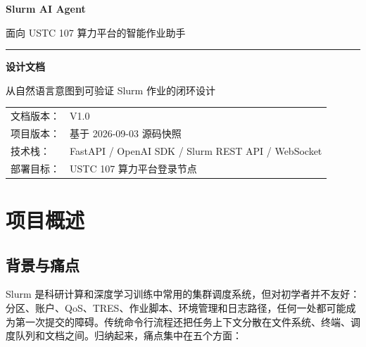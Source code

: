 \documentclass[UTF8,11pt,a4paper]{ctexart}
\begin{document}
\begin{titlepage}
  \pagecolor{navy}
  \color{white}
  \vspace*{22mm}
  {\Huge\bfseries Slurm AI Agent\par}
  \vspace{5mm}
  {\LARGE 面向 USTC 107 算力平台的智能作业助手\par}
  \vspace{12mm}
  {\color{cyan}\rule{0.76\textwidth}{1.5pt}\par}
  \vspace{12mm}
  {\fontsize{30}{36}\selectfont\bfseries 设计文档\par}
  \vspace{10mm}
  {\Large 从自然语言意图到可验证 Slurm 作业的闭环设计\par}
  \vfill
  \begin{tabular}{@{}ll@{}}
    文档版本：& V1.0\\[2mm]
    项目版本：& 基于 2026-09-03 源码快照\\[2mm]
    技术栈：& FastAPI / OpenAI SDK / Slurm REST API / WebSocket\\[2mm]
    部署目标：& USTC 107 算力平台登录节点
  \end{tabular}
  \vspace{18mm}
\end{titlepage}
\nopagecolor
\color{ink}

\begin{abstract}
Slurm AI Agent 是一套部署在共享 HPC 登录节点上的智能作业工作台。系统将项目文件、隔离环境、资源选择、作业提交、运行监控、日志分析和平台知识问答整合到一个 Web 界面，并通过大模型 Function Calling 将自然语言请求转换为可审计、可校验的工具调用。其设计重点不在于让模型直接执行任意命令，而在于把大模型限定在“理解与编排”层，把权限、资源、路径和提交过程固定在确定性后端中，形成从项目准备到结果复盘的安全闭环。
\end{abstract}

\tableofcontents
\clearpage

\section{项目概述}

\subsection{背景与痛点}
Slurm 是科研计算和深度学习训练中常用的集群调度系统，但对初学者并不友好：分区、账户、QoS、TRES、作业脚本、环境管理和日志路径，任何一处都可能成为第一次提交的障碍。传统命令行流程还把任务上下文分散在文件系统、终端、调度队列和文档之间。归纳起来，痛点集中在五个方面：
\end{document}
